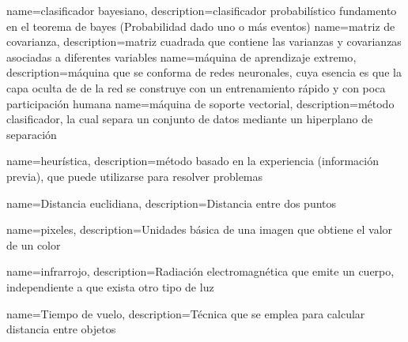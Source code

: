  {
 name={clasificador bayesiano},
 description={clasificador probabil\'istico fundamento en el teorema de bayes (Probabilidad dado uno o m\'as eventos)}
 }
 {
 name={matriz de covarianza},
 description={matriz cuadrada que contiene las varianzas y covarianzas asociadas a diferentes variables}
 } 
 {
 name={m\'aquina de aprendizaje extremo},
 description={m\'aquina que se conforma de redes neuronales, cuya esencia es que la capa oculta de de la red se construye con un entrenamiento r\'apido y con poca participaci\'on humana}
 }  
 {
 name={m\'aquina de soporte vectorial},
 description={m\'etodo clasificador, la cual separa un conjunto de datos mediante un hiperplano de separaci\'on}
 }
 
 {
 name={heur\'istica},
 description={m\'etodo basado en la experiencia (informaci\'on previa), que puede utilizarse para resolver problemas }
 }


 
 {	
 name={Distancia euclidiana},
 description={Distancia entre dos puntos}
 }
 
 
 {
 name={pixeles},
 description={Unidades b\'asica de una imagen que obtiene el valor de un color}
 }
 
 {
 name={infrarrojo},
 description={Radiaci\'on electromagn\'etica que emite un cuerpo, independiente a que exista otro tipo de luz}
 }
 
 {
 name={Tiempo de vuelo},
 description={T\'ecnica que se emplea para calcular distancia entre objetos}
 }